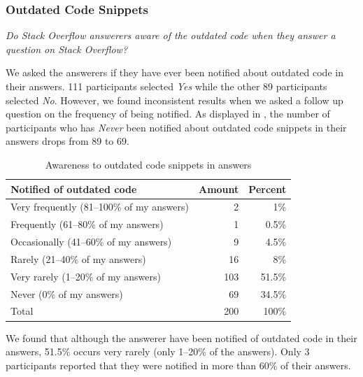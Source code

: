 \documentclass[10pt,journal,compsoc]{IEEEtran}
\begin{document}
\subsubsection{Outdated Code Snippets} 
\vspace{0.25cm}
\textit{Do Stack Overflow
	answerers aware of the outdated code when
	they answer a question on Stack Overflow?} 
\vspace{0.25cm}

We asked the answerers if they have ever been notified about outdated code in
their answers. 111 participants selected \textit{Yes} while the other 89 participants
selected \textit{No}. However, we found inconsistent results when we asked a follow up
question on the frequency of being notified. As displayed in
, the number of participants who has
\textit{Never} been notified about outdated code snippets in their answers drops
from 89 to 69.

\begin{table}
	\centering
	\caption{Awareness to outdated code snippets in answers}
	\label{tab:survey_code_snippet_outdated}
	\begin{tabular}{lrr}
		\toprule
		Notified of outdated code & Amount & Percent \\
		\midrule
		Very frequently (81--100\% of my answers) & 2 & 1\% \\
		Frequently (61--80\% of my answers) & 1 & 0.5\% \\
		Occasionally (41--60\% of my answers) & 9 & 4.5\% \\
		Rarely (21--40\% of my answers) & 16 & 8\% \\
		Very rarely (1--20\% of my answers) & 103 & 51.5\% \\
		Never (0\% of my answers) & 69 & 34.5\% \\
		\midrule
		Total & 200 & 100\% \\
		\bottomrule
	\end{tabular}
\end{table}

We found that although the answerer have been notified of
outdated code in their answers, 51.5\% occurs very rarely (only 1--20\% of the answers). 
Only 3 participants reported that they were notified in more than 60\% of their answers.
\end{document}
